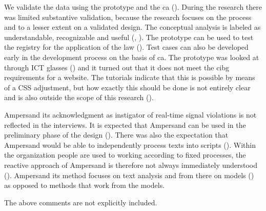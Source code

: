 We validate the data using the prototype and the \acrlong{ca} ().
During the research there was limited substantive validation, because the research focuses on the process and to a lesser extent on a validated design.
The conceptual analysis is labeled as understandable, recognizable and useful (, ).
The prototype can be used to test the registry for the application of the law ().
Test cases can also be developed early in the development process on the basis of \acrshort{ca}.
The prototype was looked at through ICT glasses () and it turned out that it does not meet the \acrshort{cibg} requirements for a website.
The tutorials indicate that this is possible by means of a CSS adjustment, but how exactly this should be done is not entirely clear and is also outside the scope of this research ().
\label{s:2_7_organisation_ampersand_use}

Ampersand its acknowledgment as instigator of real-time signal violations is not reflected in the interviews.
It is expected that Ampersand can be used in the preliminary phase of the design ().
There was also the expectation that Ampersand would be able to independently process texts into scripts ().
Within the organization people are used to working according to fixed processes, the reactive approach of Ampersand is therefore not always immediately understood ().
Ampersand its method focuses on text analysis and from there on models () as opposed to methods that work from the models.
\label{s:2_8_excluded}

The above comments are not explicitly included.

